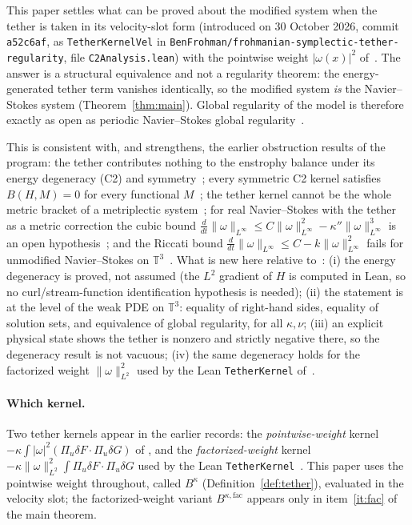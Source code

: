 \documentclass[11pt,a4paper]{article}
\theoremstyle{definition}
\theoremstyle{remark}
\newcommand{\T}{\mathbb{T}^3}
\newcommand{\lean}[1]{\texttt{#1}}
\begin{document}
This paper settles what can be proved about the modified system when the tether is taken in its
velocity-slot form (introduced on 30 October 2026, commit \texttt{a52c6af}, as \lean{TetherKernelVel} in
\lean{BenFrohman/\allowbreak frohmanian-\allowbreak symplectic-\allowbreak tether-\allowbreak regularity}, file \lean{C2Analysis.lean}) with the
pointwise weight $|\omega(x)|^2$ of~\cite{Fr21856430}. The answer is a structural equivalence and not
a regularity theorem: the energy-generated tether term vanishes identically, so the modified
system \emph{is} the Navier--Stokes system (Theorem~\ref{thm:main}). Global regularity of the
model is therefore exactly as open as periodic Navier--Stokes global regularity~\cite{Fefferman}.

This is consistent with, and strengthens, the earlier obstruction results of the program: the
tether contributes nothing to the enstrophy balance under its energy degeneracy (C2) and
symmetry~\cite{Fr23971661}; every symmetric C2 kernel satisfies $B(H,M)=0$ for every functional
$M$~\cite{Fr24120781,Fr23990195}; the tether kernel cannot be the whole metric bracket of a
metriplectic system~\cite{Fr24122008}; for real Navier--Stokes with the tether as a metric
correction the cubic bound $\frac{d}{dt}\|\omega\|_{L^\infty}\le C\|\omega\|_{L^\infty}^2-\kappa''\|\omega\|_{L^\infty}^3$ is an open hypothesis~\cite{Fr24080834};
and the Riccati bound $\frac{d}{dt}\|\omega\|_{L^\infty}\le C-k\|\omega\|_{L^\infty}^2$ fails for unmodified Navier--Stokes on
$\T$~\cite{Fr24121364,Fr24102417}. What is new here relative to~\cite{Fr23971661}: (i) the
energy degeneracy is proved, not assumed (the $L^2$ gradient of $H$ is computed in Lean, so no
curl/stream-function identification hypothesis is needed); (ii) the statement is at the level of
the weak PDE on $\T$: equality of right-hand sides, equality of solution sets, and equivalence
of global regularity, for all $\kappa,\nu$; (iii) an explicit physical state shows the tether is
nonzero and strictly negative there, so the degeneracy result is not vacuous; (iv) the same
degeneracy holds for the factorized weight $\|\omega\|_{L^2}^2$ used by the Lean
\lean{TetherKernel} of~\cite{Fr24120781}.

\paragraph{Which kernel.} Two tether kernels appear in the earlier records: the
\emph{pointwise-weight} kernel $-\kappa\int|\omega|^2(\Pi_u\delta F\cdot\Pi_u\delta G)$ of
\cite{Fr21856430}, and the \emph{factorized-weight} kernel
$-\kappa\|\omega\|_{L^2}^2\int\Pi_u\delta F\cdot\Pi_u\delta G$ used by the Lean
\lean{TetherKernel}~\cite{Fr24120781}. This paper uses the pointwise weight throughout, called
$B^\kappa$ (Definition~\ref{def:tether}), evaluated in the velocity slot; the factorized-weight
variant $B^{\kappa,\mathrm{fac}}$ appears only in item~\ref{it:fac} of the main theorem.
\end{document}
